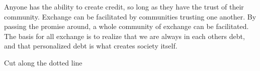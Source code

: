 \documentclass{article}
\begin{document}
\begin{minipage}[t]{0.72\textwidth}
	Anyone has the ability to create credit, so long as they have the trust of their community. Exchange can be facilitated by communities trusting one another. By passing the promise around, a whole community of exchange can be facilitated. The  basis for all exchange is to realize that we are always in each others debt, and that personalized debt is what creates society itself. 
	


\end{minipage}%
\vspace{0.2cm}
\begin{minipage}[t]{0.25\textwidth}
\vspace{0pt}
\centering
\begin{turn}{90}
\end{turn}

\vspace{0.1cm}
{\footnotesize Cut along the dotted line}
\end{minipage}
\end{document}

